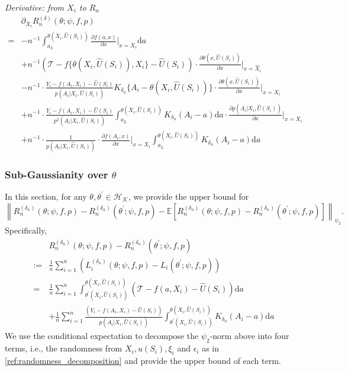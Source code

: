\documentclass[12pt]{article}
\newcommand{\E}{\mathbb{E}}
\begin{document}
\noindent \textit{Derivative: from $X_i$ to $R_n$}
\begin{align}
&\partial_{X_i}R_n^{(\delta)}(\theta;\psi,f,p)\nonumber\\
= & -n^{-1}\int_{a_L}^{\theta(X_i,\widehat U(S_i))}\frac{\partial f(a,x)}{\partial x}\bigg|_{x=X_i}\mathrm{d}a \label{eq:derivative_R_n_X_1}\\
    & + n^{-1}(\mathcal{T}-f\{\theta(X_i,\widehat U(S_i)),X_i\}-\widehat U(S_i))\cdot \frac{\partial \theta(x,\widehat U(S_i))}{\partial x}\bigg|_{x = \widehat X_i}\label{eq:derivative_R_n_X_2}\\
    & - n^{-1}\cdot\frac{Y_i - f(A_i,X_i)-\widehat U(S_i)}{p(A_i|X_i,\widehat U(S_i))}K_{\delta_n}\{A_i-\theta(X_i,\widehat U(S_i))\}\cdot \frac{\partial \theta(x,\widehat U(S_i))}{\partial x}\bigg|_{x = X_i} \label{eq:derivative_R_n_X_3}\\
    & + n^{-1}\cdot\frac{Y_i - f(A_i,X_i)-\widehat U(S_i)}{p^2(A_i|X_i,\widehat U(S_i))}\int_{a_L}^{\theta(X_i,\widehat U(S_i))} K_{\delta_n}(A_i-a)\mathrm{d}a \cdot \frac{\partial p(A_i|X_i,\widehat U(S_i))}{\partial x}\bigg|_{x = X_i} \label{eq:derivative_R_n_X_4}\\
    & + n^{-1}\cdot\frac{1}{p(A_i|X_i,\widehat U(S_i))}\cdot \frac{\partial f(A_i,x)}{\partial x}\bigg|_{x = X_i}\int_{a_L}^{\theta(X_i,\widehat U(S_i))} K_{\delta_n}(A_i-a)\mathrm{d}a  \label{eq:derivative_R_n_X_5}
\end{align}

\subsubsection{Sub-Gaussianity over $\theta$}
In this section, for any $\theta,\theta^\prime\in\mathcal{H}_{\mathcal{K}}$, we provide the upper bound for
$$\left\|R_n^{(\delta_n)}(\theta;\psi,f,p)-R_n^{({\delta_n})}(\theta^\prime;\psi,f,p)-\E\left[R_n^{(\delta_n)}(\theta;\psi,f,p)-R_n^{({\delta_n})}(\theta^\prime;\psi,f,p)\right]\right\|_{\psi_2}.$$
Specifically, 
\begin{align*}
    &R_n^{(\delta_n)}(\theta;\psi,f,p)-R_n^{({\delta_n})}(\theta^\prime;\psi,f,p)\\
    := & \frac{1}{n}\sum_{i=1}^n \left(L^{(\delta_n)}_i(\theta;\psi,f,p) - L_i(\theta^\prime;\psi,f,p)\right)
    \\
    = & \frac{1}{n}\sum_{i=1}^n\int_{\theta^\prime(X_i,\widehat U(S_i))}^{\theta(X_i,\widehat U(S_i))}(\mathcal{T} - f(a,X_i)-\widehat U(S_i))\mathrm{d}a\\
    & + \frac{1}{n}\sum_{i=1}^n\frac{(Y_i -  f(A_i,X_i)-\widehat U(S_i))}{p(A_{i}|X_{i},\widehat U(S_{i}))}  \int_{\theta^\prime(X_i,\widehat U(S_i))}^{\theta(X_i,\widehat U(S_i))}K_{\delta_n}(A_i-a)\mathrm{d}a
\end{align*}
We use the conditional expectation to decompose the $\psi_2$-norm above into four terms, i.e., the randomness from $X_i,u(S_i),\xi_i$ and $\epsilon_i$ as in \eqref{ref:randomness_decomposition} and provide the upper bound of each term. 
\end{document}

